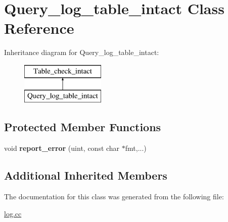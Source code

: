\hypertarget{classQuery__log__table__intact}{}\section{Query\+\_\+log\+\_\+table\+\_\+intact Class Reference}
\label{classQuery__log__table__intact}
Inheritance diagram for Query\+\_\+log\+\_\+table\+\_\+intact\+:\begin{figure}[H]
\begin{center}
\leavevmode
\includegraphics[height=2.000000cm]{classQuery__log__table__intact}
\end{center}
\end{figure}
\subsection*{Protected Member Functions}
\begin{DoxyCompactItemize}
\item 
\mbox{\label{classQuery__log__table__intact_a3f05e32afa5f26f098564fda2e21bb4b}} 
void {\bfseries report\+\_\+error} (uint, const char $\ast$fmt,...)
\end{DoxyCompactItemize}
\subsection*{Additional Inherited Members}


The documentation for this class was generated from the following file\+:\begin{DoxyCompactItemize}
\item 
\mbox{\hyperlink{log_8cc}{log.\+cc}}\end{DoxyCompactItemize}
